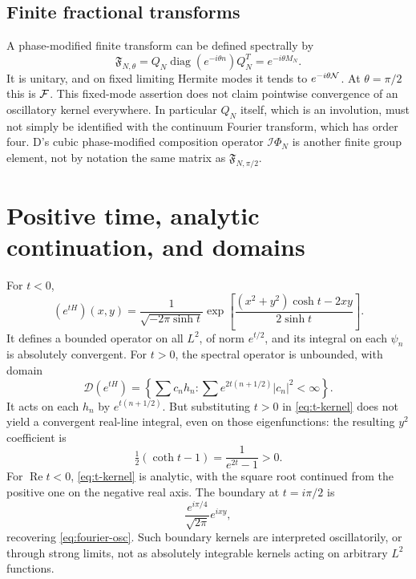 \documentclass[11pt,reqno]{amsart}
\theoremstyle{remark}\newtheorem{remark}[proposition]{Remark}
\DeclareMathOperator{\diag}{diag}
\begin{document}
\subsection{Finite fractional transforms}
A phase-modified finite transform can be defined spectrally by
\[
 \mathfrak F_{N,\theta}=Q_N\diag(e^{-i\theta n})Q_N^T=e^{-i\theta M_N}.
\]
It is unitary, and on fixed limiting Hermite modes it tends to
$e^{-i\theta\mathcal N}$. At $\theta=\pi/2$ this is $\mathcal F$.
This fixed-mode assertion does not claim pointwise convergence of an
oscillatory kernel everywhere. In particular $Q_N$ itself, which is
an involution, must not simply be identified with the continuum Fourier
transform, which has order four. D's cubic phase-modified composition
operator $\mathcal I\Phi_N$ is another finite group element, not by
notation the same matrix as $\mathfrak F_{N,\pi/2}$.

\section{Positive time, analytic continuation, and domains}
For $t<0$,
\begin{equation}\label{eq:t-kernel}
 (e^{tH})(x,y)=\frac1{\sqrt{-2\pi\sinh t}}
 \exp\left[\frac{(x^2+y^2)\cosh t-2xy}{2\sinh t}\right].
\end{equation}
It defines a bounded operator on all $L^2$, of norm $e^{t/2}$, and its
integral on each $\psi_n$ is absolutely convergent.
For $t>0$, the spectral operator is unbounded, with domain
\[
 \mathcal D(e^{tH})=
 \left\{\sum c_nh_n:\sum e^{2t(n+1/2)}|c_n|^2<\infty\right\}.
\]
It acts on each $h_n$ by $e^{t(n+1/2)}$. But substituting $t>0$ in
\eqref{eq:t-kernel} does not yield a convergent real-line integral,
even on those eigenfunctions: the resulting $y^2$ coefficient is
\[
 \tfrac12(\coth t-1)=\frac1{e^{2t}-1}>0.
\]
For $\operatorname{Re}t<0$, \eqref{eq:t-kernel} is analytic, with the
square root continued from the positive one on the negative real axis.
The boundary at $t=i\pi/2$ is
\[
 \frac{e^{i\pi/4}}{\sqrt{2\pi}}e^{ixy},
\]
recovering \eqref{eq:fourier-osc}. Such boundary kernels are interpreted
oscillatorily, or through strong limits, not as absolutely integrable
kernels acting on arbitrary $L^2$ functions.
\end{document}
